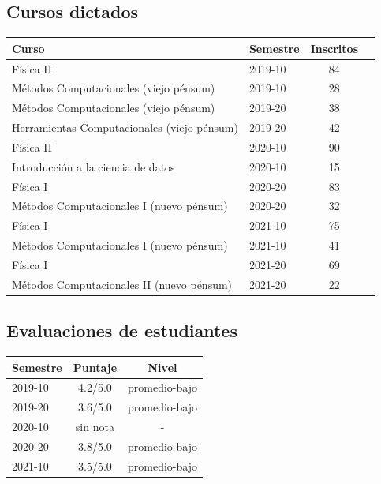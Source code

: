 \documentclass{article}
\begin{document}
\subsection{Cursos dictados}
\begin{tabular}{p{7.5cm} l c c}\hline
Curso & Semestre & Inscritos \\\hline

F\'isica II & 2019-10 &  84 \\
M\'etodos Computacionales  (viejo p\'ensum) & 2019-10 &  28  \\\hline

M\'etodos Computacionales (viejo p\'ensum) & 2019-20 &   38\\
Herramientas Computacionales (viejo p\'ensum) & 2019-20 &  42 \\\hline

F\'isica II & 2020-10 & 90 \\ 
Introducci\'on a la ciencia de datos & 2020-10 & 15 \\\hline

F\'isica I & 2020-20 & 83 \\
M\'etodos Computacionales I (nuevo p\'ensum) & 2020-20 & 32 \\\hline

F\'isica I & 2021-10 & 75 \\
M\'etodos Computacionales I (nuevo p\'ensum) & 2021-10 & 41 \\\hline

F\'isica I & 2021-20 & 69 \\
M\'etodos Computacionales II (nuevo p\'ensum) & 2021-20 & 22 \\\hline
\end{tabular}

\subsection{Evaluaciones de estudiantes}
\begin{tabular}{l c c }\hline
Semestre & Puntaje & Nivel \\\hline
2019-10 & 4.2/5.0 & promedio-bajo\\\hline
2019-20 & 3.6/5.0 & promedio-bajo\\\hline
2020-10 & sin nota & - \\\hline
2020-20 & 3.8/5.0 & promedio-bajo\\\hline
2021-10 & 3.5/5.0 & promedio-bajo\\\hline
\end{tabular}
\end{document}
